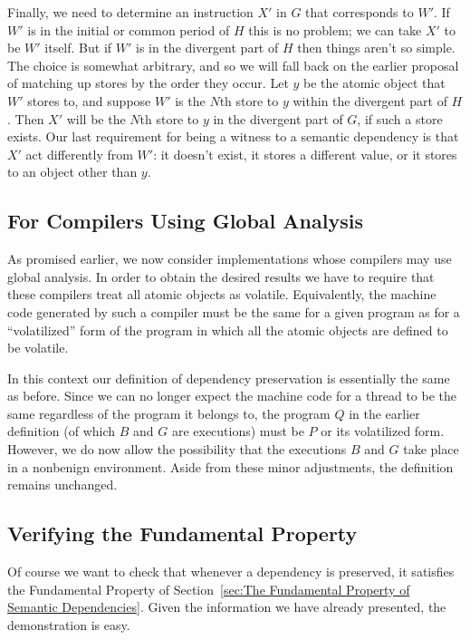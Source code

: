 Finally, we need to determine an instruction $X'$ in $G$ that
corresponds to $W'$.
If $W'$ is in the initial or common period of $H$ this is no
problem; we can take $X'$ to be $W'$ itself.
But if $W'$ is in the divergent part of $H$ then things aren't so
simple.
The choice is somewhat arbitrary, and so we will fall back on the
earlier proposal of matching up stores by the order they occur.
Let $y$ be the atomic object that $W'$ stores to, and suppose $W'$
is the $N$th store to $y$ within the divergent part of $H$.
Then $X'$ will be the $N$th store to $y$ in the divergent part
of $G$, if such a store exists.
Our last requirement for being a witness to a semantic dependency
is that $X'$ act differently from $W'$: it doesn't exist, it stores
a different value, or it stores to an object other than $y$.

\subsection{For Compilers Using Global Analysis}
\label{sec:For Compilers Using Global Analysis}

As promised earlier, we now consider implementations whose compilers
may use global analysis.
In order to obtain the desired results we have to require that these
compilers treat all atomic objects as volatile.
Equivalently, the machine code generated by such a compiler must be
the same for a given program as for a ``volatilized'' form of the
program in which all the atomic objects are defined to be volatile.

In this context our definition of dependency preservation is essentially
the same as before.
Since we can no longer expect the machine code for a thread to be the
same regardless of the program it belongs to, the program $Q$ in the
earlier definition (of which $B$ and $G$ are executions) must be
$P$ or its volatilized form.
However, we do now allow the possibility that the executions $B$ and
$G$ take place in a nonbenign environment.
Aside from these minor adjustments, the definition remains unchanged.

\subsection{Verifying the Fundamental Property}
\label{sec:Verifying the Fundamental Property}

Of course we want to check that whenever a dependency is preserved,
it satisfies the Fundamental Property of
Section~\ref{sec:The Fundamental Property of Semantic Dependencies}.
Given the information we have already presented, the demonstration is
easy.

